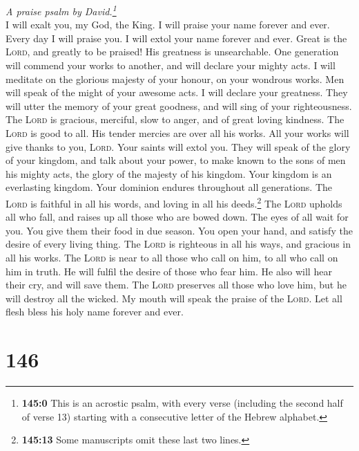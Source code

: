 \emph{A praise psalm by David.\footnote{\textbf{145:0} This is an
  acrostic psalm, with every verse (including the second half of verse
  13) starting with a consecutive letter of the Hebrew alphabet.}}\\
 I will exalt you, my God, the King. I will praise your
name forever and ever.  Every day I will praise you. I
will extol your name forever and ever.  Great is the
\textsc{Lord}, and greatly to be praised! His greatness is unsearchable.
 One generation will commend your works to another, and
will declare your mighty acts.  I will meditate on the
glorious majesty of your honour, on your wondrous works. 
Men will speak of the might of your awesome acts. I will declare your
greatness.  They will utter the memory of your great
goodness, and will sing of your righteousness.  The
\textsc{Lord} is gracious, merciful, slow to anger, and of great loving
kindness.  The \textsc{Lord} is good to all. His tender
mercies are over all his works.  All your works will give
thanks to you, \textsc{Lord}. Your saints will extol you.
 They will speak of the glory of your kingdom, and talk
about your power,  to make known to the sons of men his
mighty acts, the glory of the majesty of his kingdom. 
Your kingdom is an everlasting kingdom. Your dominion endures throughout
all generations. The \textsc{Lord} is faithful in all his words, and
loving in all his deeds.\footnote{\textbf{145:13} Some manuscripts omit
  these last two lines.}  The \textsc{Lord} upholds all
who fall, and raises up all those who are bowed down. 
The eyes of all wait for you. You give them their food in due season.
 You open your hand, and satisfy the desire of every
living thing.  The \textsc{Lord} is righteous in all his
ways, and gracious in all his works.  The \textsc{Lord}
is near to all those who call on him, to all who call on him in truth.
 He will fulfil the desire of those who fear him. He also
will hear their cry, and will save them.  The
\textsc{Lord} preserves all those who love him, but he will destroy all
the wicked.  My mouth will speak the praise of the
\textsc{Lord}. Let all flesh bless his holy name forever and ever.

\hypertarget{section-145}{%
\section{146}\label{section-145}}

